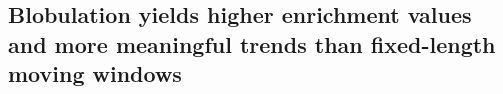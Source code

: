 \documentclass[10pt,letterpaper]{article}
\newcommand{\dSNPs}{dSNPs~}
\newcommand{\ruchi}[1]{\textcolor{blue}{#1}}
\begin{document}

\subsection*{Blobulation yields higher enrichment values and more meaningful trends than fixed-length moving windows}
\end{document}
